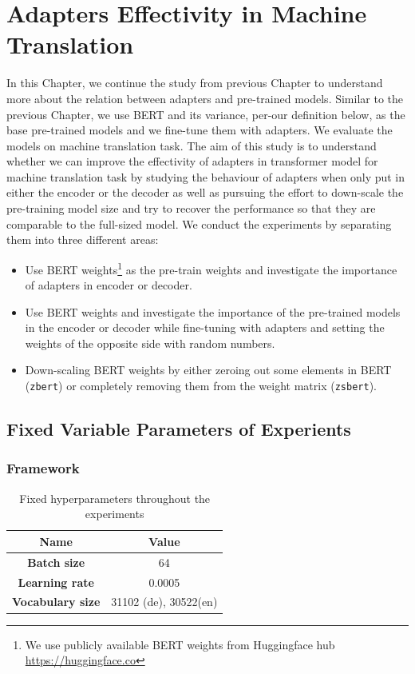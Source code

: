 
\chapter{Adapters Effectivity in Machine Translation}
In this Chapter, we continue the study from previous Chapter to understand more about the relation between adapters and pre-trained models. Similar to the previous Chapter, we use BERT and its variance, per-our definition below, as the base pre-trained models and we fine-tune them with adapters. We evaluate the models on machine translation task. The aim of this study is to understand whether we can improve the effectivity of adapters in transformer model for machine translation task by studying the behaviour of adapters when only put in either the encoder or the decoder as well as pursuing the effort to down-scale the pre-training model size and try to recover the performance so that they are comparable to the full-sized model. We conduct the experiments by separating them into three different areas:
\begin{itemize}
    \item Use BERT weights\footnote{We use publicly available BERT weights from Huggingface hub \url{https://huggingface.co}} as the pre-train weights and investigate the importance of adapters in encoder or decoder.
    \item Use BERT weights and investigate the importance of the pre-trained models in the encoder or decoder while fine-tuning with adapters and setting the weights of the opposite side with random numbers.
    \item Down-scaling BERT weights by either zeroing out some elements in BERT (\texttt{zbert}) or completely removing them from the weight matrix (\texttt{zsbert}).
\end{itemize}

\section{Fixed Variable Parameters of Experients}
\subsection{Framework}
\begin{table}[]
    \centering
    \begin{tabular}{@{}cc@{}}
        \toprule
        \textbf{Name}            & \textbf{Value}        \\ \midrule
        \textbf{Batch size}      & 64                    \\
        \textbf{Learning rate}   & 0.0005                \\
        \textbf{Vocabulary size} & 31102 (de), 30522(en) \\ \bottomrule
    \end{tabular}
    \caption{Fixed hyperparameters throughout the experiments}
    \label{tab:hyp_invest}
\end{table}

